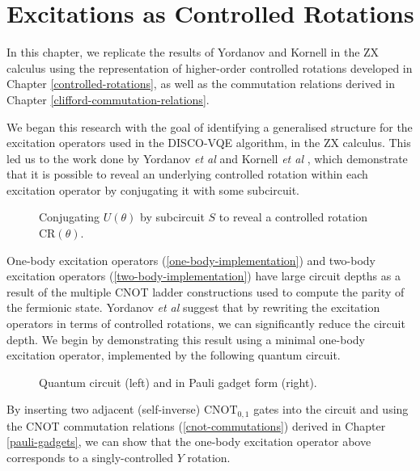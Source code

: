 \section{Excitations as Controlled Rotations}%
\label{operator-controlled-rotations}

In this chapter, we replicate the results of Yordanov and Kornell in the ZX calculus using the representation of higher-order controlled rotations developed in Chapter \ref{controlled-rotations}, as well as the commutation relations derived in Chapter \ref{clifford-commutation-relations}.

We began this research with the goal of identifying a generalised structure for the excitation operators used in the DISCO-VQE algorithm, in the ZX calculus. This led us to the work done by Yordanov \textit{et al} \cite{Yordanov2020} and Kornell \textit{et al} \cite{Kornell2023}, which demonstrate that it is possible to reveal an underlying controlled rotation within each excitation operator by conjugating it with some subcircuit.

\begin{figure}[H]
    \centering
    \caption{Conjugating $U(\theta)$ by subcircuit $S$ to reveal a controlled rotation CR$(\theta)$.}
\end{figure}

One-body excitation operators (\ref{one-body-implementation}) and two-body excitation operators (\ref{two-body-implementation}) have large circuit depths as a result of the multiple CNOT ladder constructions used to compute the parity of the fermionic state. Yordanov \textit{et al} suggest that by rewriting the excitation operators in terms of controlled rotations, we can significantly reduce the circuit depth. We begin by demonstrating this result using a minimal one-body excitation operator, implemented by the following quantum circuit.

\begin{figure}[H]
    \centering
    \caption{Quantum circuit (left) and in Pauli gadget form (right).}
    \label{minimal-one-body}
\end{figure}

By inserting two adjacent (self-inverse) $\text{CNOT}_{0, 1}$ gates into the circuit and using the CNOT commutation relations (\ref{cnot-commutations}) derived in Chapter \ref{pauli-gadgets}, we can show that the one-body excitation operator above corresponds to a singly-controlled $Y$ rotation.

